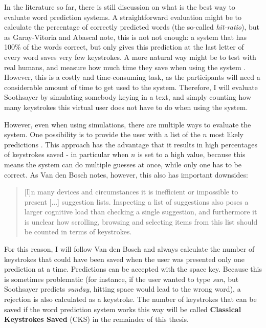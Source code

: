 \documentclass[11pt]{article}
\begin{document}
In the literature so far, there is still discussion on what is the best way to evaluate word prediction systems. A straightforward evaluation might be to calculate the percentage of correctly predicted words (the so-called \emph{hit-ratio}), but as Garay-Vitoria and Abascal  note, this is not not enough: a system that has 100\% of the words correct, but only gives this prediction at the last letter of every word saves very few keystrokes. A more natural way might be to test with real humans, and measure how much time they save when using the system \cite{carlberger+97,koester+98,Garay-Vitoria+06}. However, this is a costly and time-consuming task, as the participants will need a considerable amount of time to get used to the system. Therefore, I will evaluate Soothsayer by simulating somebody keying in a text, and simply counting how many keystrokes this virtual user does not have to do when using the system. 

However, even when using simulations, there are multiple ways to evaluate the system. One possibility is to provide the user with a list of the $n$ most likely predictions \cite{Lesher+99,Fazly+03}. This approach has the advantage that it results in high percentages of keystrokes saved - in particular when $n$ is set to a high value, because this means the system can do multiple guesses at once, while only one has to be correct. As Van den Bosch  notes, however, this also has important downsides: 

\begin{quotation}
[I]n many devices and circumstances it is inefficient or impossible to present [...] suggestion lists. Inspecting a list of suggestions also poses a larger cognitive load than checking a single suggestion, and furthermore it is unclear how scrolling, browsing and selecting items from this list should be counted in terms of keystrokes.
\end{quotation}

For this reason, I will follow Van den Bosch  and always calculate the number of keystrokes that could have been saved when the user was presented only one prediction at a time. Predictions can be accepted with the space key. Because this is sometimes problematic (for instance, if the user wanted to type \emph{sun}, but Soothsayer predicts \emph{sunday}, hitting space would lead to the wrong word), a rejection is also calculated as a keystroke. The number of keystrokes that can be saved if the word prediction system works this way will be called \textbf{Classical Keystrokes Saved} (CKS) in the remainder of this thesis.
\end{document}
